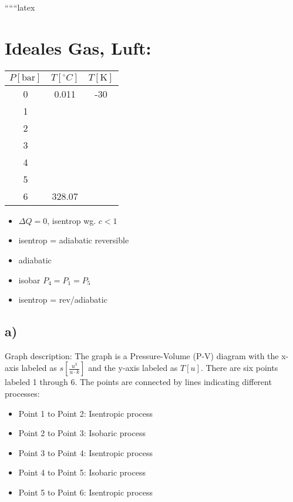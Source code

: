 
``````latex


\section*{Ideales Gas, Luft:}

\begin{tabular}{|c|c|c|}
\hline
$P[\text{bar}]$ & $T[^\circ C]$ & $T[\text{K}]$ \\
\hline
0 & 0.011 & -30 \\
1 & & \\
2 & & \\
3 & & \\
4 & & \\
5 & & \\
6 & 328.07 & \\
\hline
\end{tabular}

\begin{itemize}
    \item $\Delta Q = 0$, isentrop wg. $c < 1$ \\
    \item isentrop = adiabatic reversible \\
    \item adiabatic \\
    \item isobar $P_4 = P_1 = P_5$ \\
    \item isentrop = rev/adiabatic \\
\end{itemize}

\subsection*{a)}

Graph description: The graph is a Pressure-Volume (P-V) diagram with the x-axis labeled as $s \left[ \frac{u^3}{u \cdot k} \right]$ and the y-axis labeled as $T \left[ u \right]$. There are six points labeled 1 through 6. The points are connected by lines indicating different processes:

\begin{itemize}
    \item Point 1 to Point 2: Isentropic process
    \item Point 2 to Point 3: Isobaric process
    \item Point 3 to Point 4: Isentropic process
    \item Point 4 to Point 5: Isobaric process
    \item Point 5 to Point 6: Isentropic process
\end{itemize}

